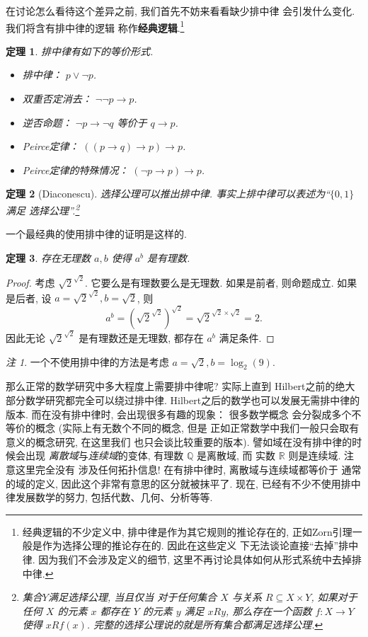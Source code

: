 \documentclass[UTF8]{ctexbook}
\theoremstyle{plain}
\newtheorem{theorem}{定理}[chapter]
\theoremstyle{definition}
\theoremstyle{remark}
\newtheorem*{remark}{注}
\begin{document}
在讨论怎么看待这个差异之前, 我们首先不妨来看看缺少排中律
会引发什么变化. 我们将含有排中律的逻辑
称作\textbf{经典逻辑}.\footnote{经典逻辑的不少定义中,
排中律是作为其它规则的推论存在的,
正如Zorn引理一般是作为选择公理的推论存在的. 因此在这些定义
下无法谈论直接“去掉”排中律. 因为我们不会涉及定义的细节,
这里不再讨论具体如何从形式系统中去掉排中律.}
\begin{theorem}
排中律有如下的等价形式.
\begin{itemize}
\item 排中律： \(p \vee \neg p\).
\item 双重否定消去： \(\neg\neg p \to p\).
\item 逆否命题： \(\neg p \to \neg q\) 等价于 \(q \to p\).
\item Peirce定律： \(((p \to q) \to p) \to p\).
\item Peirce定律的特殊情况： \((\neg p\to p) \to p\).
\end{itemize}
\end{theorem}
\begin{theorem}[Diaconescu]
选择公理可以推出排中律.
事实上排中律可以表述为“\(\{0,1\}\)满足
选择公理”.\footnote{集合\(Y\)满足选择公理, 当且仅当
对于任何集合 \(X\) 与关系 \(R \subseteq X \times Y\), 如果对于
任何 \(X\) 的元素 \(x\) 都存在 \(Y\) 的元素 \(y\)
满足 \(xRy\), 那么存在一个函数 \(f : X \to Y\) 使得
\(xRf(x)\). 完整的选择公理说的就是所有集合都满足选择公理.}
\end{theorem}

一个最经典的使用排中律的证明是这样的.
\begin{theorem}
存在无理数 \(a,b\) 使得 \(a^b\) 是有理数.
\end{theorem}
\begin{proof}
考虑 \({\sqrt2}^{\sqrt2}\). 它要么是有理数要么是无理数.
如果是前者, 则命题成立. 如果是后者, 设 \(a = {\sqrt2}^{\sqrt2},
b = \sqrt 2\), 则
\[a^b = \left({\sqrt2}^{\sqrt2}\right)^{\sqrt2} = {\sqrt2}^{\sqrt2\times\sqrt2} = 2.\]
因此无论 \({\sqrt2}^{\sqrt2}\) 是有理数还是无理数,
都存在 \(a^b\) 满足条件.
\end{proof}
\begin{remark}
一个不使用排中律的方法是考虑 \(a = \sqrt 2, b = \log_2(9).\)
\end{remark}

那么正常的数学研究中多大程度上需要排中律呢? 实际上直到
Hilbert之前的绝大部分数学研究都完全可以绕过排中律.
Hilbert之后的数学也可以发展无需排中律的版本.
而在没有排中律时, 会出现很多有趣的现象： 很多数学概念
会分裂成多个不等价的概念 (实际上有无数个不同的概念, 但是
正如正常数学中我们一般只会取有意义的概念研究, 在这里我们
也只会谈比较重要的版本). 譬如域在没有排中律的时候会出现%
\emph{离散域}与\emph{连续域}的变体, 有理数
\(\mathbb Q\) 是离散域, 而
实数 \(\mathbb R\) 则是连续域. 注意这里完全没有
涉及任何拓扑信息! 在有排中律时, 离散域与连续域都等价于
通常的域的定义, 因此这个非常有意思的区分就被抹平了.
现在, 已经有不少不使用排中律发展数学的努力,
包括代数、几何、分析等等.
\end{document}
